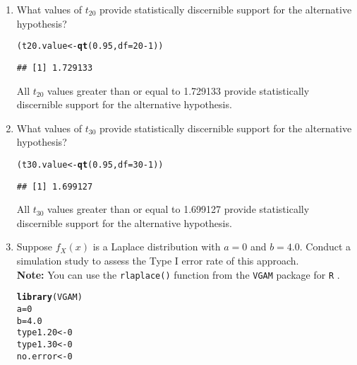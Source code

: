 \documentclass{article}\usepackage[]{graphicx}\usepackage[]{xcolor}
\makeatletter
\newcommand{\hlnum}[1]{\textcolor[rgb]{0.686,0.059,0.569}{#1}}%
\newcommand{\hlopt}[1]{\textcolor[rgb]{0,0,0}{#1}}%
\newcommand{\hldef}[1]{\textcolor[rgb]{0.345,0.345,0.345}{#1}}%
\newcommand{\hlkwb}[1]{\textcolor[rgb]{0.69,0.353,0.396}{#1}}%
\newcommand{\hlkwc}[1]{\textcolor[rgb]{0.333,0.667,0.333}{#1}}%
\newcommand{\hlkwd}[1]{\textcolor[rgb]{0.737,0.353,0.396}{\textbf{#1}}}%
\newenvironment{kframe}{%
 \def\at@end@of@kframe{}%
 \ifinner\ifhmode%
  \def\at@end@of@kframe{\end{minipage}}%
  \begin{minipage}{\columnwidth}%
 \fi\fi%
 \def\FrameCommand##1{\hskip\@totalleftmargin \hskip-\fboxsep
 \colorbox{shadecolor}{##1}\hskip-\fboxsep
     \hskip-\linewidth \hskip-\@totalleftmargin \hskip\columnwidth}%
 \MakeFramed {\advance\hsize-\width
   \@totalleftmargin\z@ \linewidth\hsize
   \@setminipage}}%
 {\par\unskip\endMakeFramed%
 \at@end@of@kframe}
\newenvironment{knitrout}{}{} %
\makeatother
\begin{document}
\begin{enumerate}
\begin{enumerate}
  \item What values of $t_{20}$ provide statistically discernible support for the
  alternative hypothesis?
\begin{knitrout}
\color{fgcolor}\begin{kframe}
\begin{alltt}
\hldef{(t20.value} \hlkwb{<-} \hlkwd{qt}\hldef{(}\hlnum{0.95}\hldef{,} \hlkwc{df} \hldef{=} \hlnum{20}\hlopt{-}\hlnum{1}\hldef{))}
\end{alltt}
\begin{verbatim}
## [1] 1.729133
\end{verbatim}
\end{kframe}
\end{knitrout}
All $t_{20}$ values greater than or equal to 1.729133 provide statistically discernible support for the
  alternative hypothesis.
  \item What values of $t_{30}$ provide statistically discernible support for the
  alternative hypothesis?
\begin{knitrout}
\color{fgcolor}\begin{kframe}
\begin{alltt}
\hldef{(t30.value} \hlkwb{<-} \hlkwd{qt}\hldef{(}\hlnum{0.95}\hldef{,} \hlkwc{df} \hldef{=} \hlnum{30}\hlopt{-}\hlnum{1}\hldef{))}
\end{alltt}
\begin{verbatim}
## [1] 1.699127
\end{verbatim}
\end{kframe}
\end{knitrout}
All $t_{30}$ values greater than or equal to 1.699127 provide statistically discernible support for the
  alternative hypothesis.
  \item Suppose $f_X(x)$ is a Laplace distribution with $a=0$ and $b=4.0$.
  Conduct a simulation study to assess the Type I error rate of this approach.\\
  \textbf{Note:} You can use the \texttt{rlaplace()} function from the \texttt{VGAM}
  package for \texttt{R} \citep{VGAM}.
\begin{knitrout}
\color{fgcolor}\begin{kframe}
\begin{alltt}
\hlkwd{library}\hldef{(VGAM)}
\hldef{a} \hlkwb{=} \hlnum{0}
\hldef{b} \hlkwb{=} \hlnum{4.0}
\hldef{type1.20} \hlkwb{<-} \hlnum{0}
\hldef{type1.30} \hlkwb{<-} \hlnum{0}
\hldef{no.error} \hlkwb{<-} \hlnum{0}


\end{alltt}
\end{kframe}
\end{knitrout}
\end{enumerate}
\end{enumerate}
\end{document}
